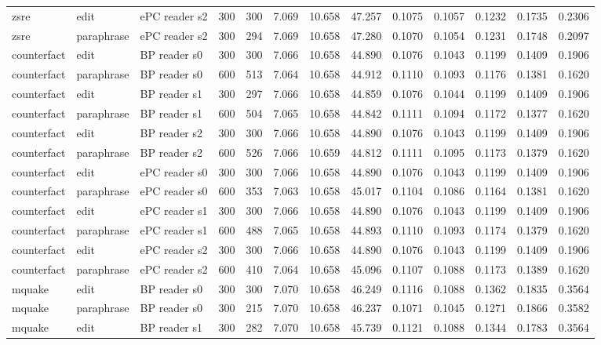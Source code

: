 \documentclass[10pt,a4paper]{article}
\begin{document}
\begin{center}
\begin{tabularx}{\textwidth}{@{}p{}XXXXXXXXXXXX@{}}
zsre & edit & ePC reader s2 & 300 & 300 & 7.069 & 10.658 & 47.257 & 0.1075 & 0.1057 & 0.1232 & 0.1735 & 0.2306 \\
zsre & paraphrase & ePC reader s2 & 300 & 294 & 7.069 & 10.658 & 47.280 & 0.1070 & 0.1054 & 0.1231 & 0.1748 & 0.2097 \\
counterfact & edit & BP reader s0 & 300 & 300 & 7.066 & 10.658 & 44.890 & 0.1076 & 0.1043 & 0.1199 & 0.1409 & 0.1906 \\
counterfact & paraphrase & BP reader s0 & 600 & 513 & 7.064 & 10.658 & 44.912 & 0.1110 & 0.1093 & 0.1176 & 0.1381 & 0.1620 \\
counterfact & edit & BP reader s1 & 300 & 297 & 7.066 & 10.658 & 44.859 & 0.1076 & 0.1044 & 0.1199 & 0.1409 & 0.1906 \\
counterfact & paraphrase & BP reader s1 & 600 & 504 & 7.065 & 10.658 & 44.842 & 0.1111 & 0.1094 & 0.1172 & 0.1377 & 0.1620 \\
counterfact & edit & BP reader s2 & 300 & 300 & 7.066 & 10.658 & 44.890 & 0.1076 & 0.1043 & 0.1199 & 0.1409 & 0.1906 \\
counterfact & paraphrase & BP reader s2 & 600 & 526 & 7.066 & 10.659 & 44.812 & 0.1111 & 0.1095 & 0.1173 & 0.1379 & 0.1620 \\
counterfact & edit & ePC reader s0 & 300 & 300 & 7.066 & 10.658 & 44.890 & 0.1076 & 0.1043 & 0.1199 & 0.1409 & 0.1906 \\
counterfact & paraphrase & ePC reader s0 & 600 & 353 & 7.063 & 10.658 & 45.017 & 0.1104 & 0.1086 & 0.1164 & 0.1381 & 0.1620 \\
counterfact & edit & ePC reader s1 & 300 & 300 & 7.066 & 10.658 & 44.890 & 0.1076 & 0.1043 & 0.1199 & 0.1409 & 0.1906 \\
counterfact & paraphrase & ePC reader s1 & 600 & 488 & 7.065 & 10.658 & 44.893 & 0.1110 & 0.1093 & 0.1174 & 0.1379 & 0.1620 \\
counterfact & edit & ePC reader s2 & 300 & 300 & 7.066 & 10.658 & 44.890 & 0.1076 & 0.1043 & 0.1199 & 0.1409 & 0.1906 \\
counterfact & paraphrase & ePC reader s2 & 600 & 410 & 7.064 & 10.658 & 45.096 & 0.1107 & 0.1088 & 0.1173 & 0.1389 & 0.1620 \\
mquake & edit & BP reader s0 & 300 & 300 & 7.070 & 10.658 & 46.249 & 0.1116 & 0.1088 & 0.1362 & 0.1835 & 0.3564 \\
mquake & paraphrase & BP reader s0 & 300 & 215 & 7.070 & 10.658 & 46.237 & 0.1071 & 0.1045 & 0.1271 & 0.1866 & 0.3582 \\
mquake & edit & BP reader s1 & 300 & 282 & 7.070 & 10.658 & 45.739 & 0.1121 & 0.1088 & 0.1344 & 0.1783 & 0.3564 \\

\end{tabularx}
\end{center}
\end{document}
